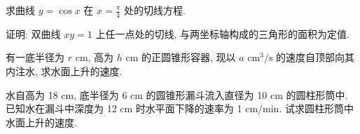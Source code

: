 \begin{exercise}[3.1.23]
    求曲线 $y=\cos x$ 在 $x=\frac{\pi}{4}$ 处的切线方程.
\end{exercise}

\begin{exercise}[3.1.24]
    证明: 双曲线 $xy=1$ 上任一点处的切线, 与两坐标轴构成的三角形的面积为定值.
\end{exercise}

\begin{exercise}[3.1.25]
    有一底半径为 $r$ cm, 高为 $h$ cm 的正圆锥形容器, 现以 $a \text{ cm}^3/\text{s}$ 的速度自顶部向其内注水, 求水面上升的速度.
\end{exercise}

\begin{exercise}[3.1.26]
    水自高为 18 cm, 底半径为 6 cm 的圆锥形漏斗流入直径为 10 cm 的圆柱形筒中. 已知水在漏斗中深度为 12 cm 时水平面下降的速率为 1 cm/min. 试求圆柱形筒中水面上升的速度.
\end{exercise}

\newpage
